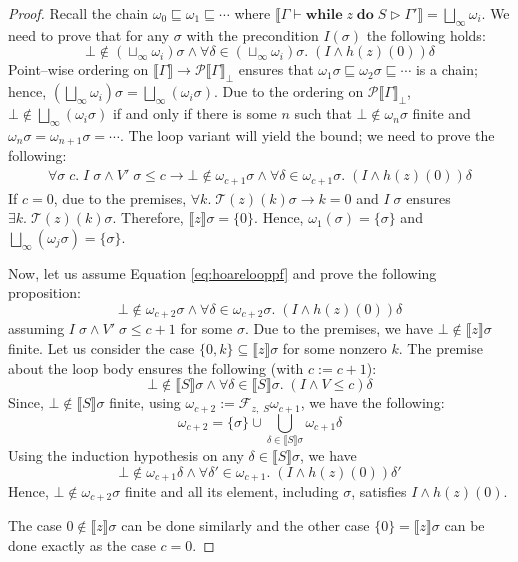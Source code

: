 \documentclass{article}
\newcommand{\sem}[1]{\llbracket #1 \rrbracket }
\newcommand{\trans}[1]{\mathcal{T}( #1) }
\begin{document}
\begin{proof}
 
Recall the chain $\omega_0\sqsubseteq\omega_1\sqsubseteq \cdots$ where
$\sem{\Gamma \vdash \textbf{while}\;z\;\textbf{do}\;S \triangleright \Gamma'} = \bigsqcup_\infty \omega_i$.
We need to prove that for any $\sigma$ with the precondition $I(\sigma)$ the following holds:
\[
\bot \not \in (\sqcup_\infty \omega_i)\sigma \land \forall \delta \in 
(\sqcup_\infty \omega_i)\sigma.\;(I\land h(z)(0))\delta
\]
Point--wise ordering on $\sem{\Gamma}\to\mathcal{P}\sem{\Gamma}_\bot$
ensures that $\omega_1\sigma \sqsubseteq \omega_2\sigma \sqsubseteq \cdots$ is a chain;
hence, $(\bigsqcup_\infty \omega_i)\sigma = \bigsqcup_\infty (\omega_i \sigma)$.
Due to the ordering on $\mathcal{P}\sem{\Gamma}_\bot$,
$\bot\not\in \bigsqcup_\infty (\omega_i\sigma)$ if and only if
there is some $n$ such that $\bot \not \in \omega_n\sigma$ finite and
$\omega_{n} \sigma = \omega_{n+1} \sigma =\cdots$.
The loop variant will 
yield the bound; we need to prove the following:
\begin{align}
\label{eq:hoarelooppf}
\forall \sigma\;c.\;I \;\sigma\land V'\;\sigma\leq c \to 
\bot \not \in \omega_{c+1}\sigma \land \forall \delta \in 
\omega_{c+1}\sigma.\;(I\land h(z)(0))\delta
\end{align}
If $c=0$, due to the premises, $\forall k.\;\trans{z}(k)\sigma \to k=0$ and $I\;\sigma$ ensures $\exists k.\;\trans{z}(k)\sigma$.
Therefore, $\sem{z}\sigma =\{0\}$.
Hence, $\omega_1(\sigma) =  \{\sigma\}$ and $\bigsqcup_\infty(\omega_j \sigma) = \{\sigma\}$.

\vspace{1em}

Now, let us assume Equation \ref{eq:hoarelooppf} and prove
the following proposition:
\[ 
\bot \not \in \omega_{c+2}\sigma \land \forall \delta \in 
\omega_{c+2}\sigma.\;(I\land h(z)(0))\delta
\]
assuming $I\;\sigma\land V'\;\sigma\leq c+1$ for some $\sigma$. Due to the premises, we have $\bot\not\in\sem{z}\sigma$ finite.
Let us consider the case $\{0,k\}\subseteq\sem{z}\sigma$ for some nonzero $k$.
The premise about the loop body ensures the following (with $c := c+1$):
\[
\bot\not\in\sem{S}\sigma\land
\forall \delta \in \sem{S}\sigma.\; (I\land V\leq c)\delta
\]
Since, $\bot\not\in\sem{S}\sigma$ finite, using $\omega_{c+2}:=\mathcal{F}_{z,\;S}\omega_{c+1}$, we have the following:
\[
\omega_{c+2} = \{\sigma\}\cup\bigcup_{\delta \in \sem{S}\sigma} \omega_{c+1}\delta
\]
Using the induction hypothesis on any $\delta\in\sem{S}\sigma$, we have
\[
\bot\not\in \omega_{c+1}\delta \land \forall \delta' \in \omega_{c+1}.\; (I\land h(z)(0))\delta'
\]
Hence, $\bot\not\in\omega_{c+2}\sigma$ finite and all its element, including $\sigma$, satisfies $I\land h(z)(0)$.

The case $0\not\in\sem{z}\sigma$ can be done similarly and the other case $\{0\}=\sem{z}\sigma$ can be
done exactly as the case $c=0$.
\end{proof}
\end{document}
